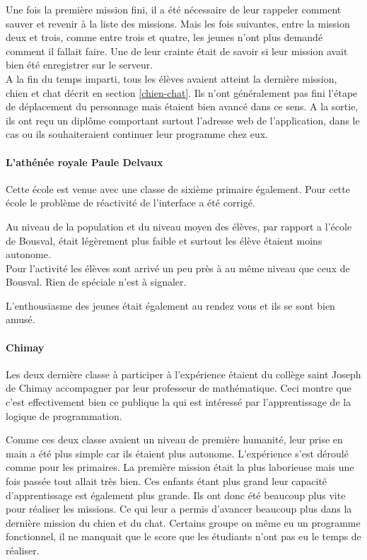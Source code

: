 Une fois la première mission fini, il a été nécessaire de leur rappeler comment sauver et revenir à la liste des missions. Mais les fois suivantes, entre la mission deux et trois, comme entre trois et quatre, les jeunes n'ont plus demandé comment il fallait faire. Une de leur crainte était de savoir si leur mission avait bien été enregistrer sur le serveur.\\ %

A la fin du temps imparti, tous les élèves avaient atteint la dernière mission, chien et chat décrit en section \ref{chien-chat}. Ils n'ont généralement pas fini l'étape de déplacement du personnage mais étaient bien avancé dans ce sens. A la sortie, ils ont reçu un diplôme comportant surtout l'adresse web de l'application, dans le cas ou ils souhaiteraient continuer leur programme chez eux.

\paragraph{L'athénée royale Paule Delvaux}
Cette école est venue avec une classe de sixième primaire également. Pour cette école le problème de réactivité de l'interface a été corrigé.

Au niveau de la population et du niveau moyen des élèves, par rapport a l'école de Bousval, était légèrement plus faible et surtout les élève étaient moins autonome.\\

Pour l'activité les élèves sont arrivé un peu près à au même niveau que ceux de Bousval. Rien de spéciale n'est à signaler.

L'enthousiasme des jeunes était également au rendez vous et ils se sont bien amusé.

\paragraph{Chimay}
Les deux dernière classe à participer à l'expérience étaient du collège saint Joseph de Chimay accompagner par leur professeur de mathématique. Ceci montre que c'est effectivement bien ce publique la qui est intéressé par l'apprentissage de la logique de programmation.

Comme ces deux classe avaient un niveau de première humanité, leur prise en main a été plus simple car ils étaient plus autonome. L'expérience s'est déroulé comme pour les primaires. La première mission était la plus laborieuse mais une fois passée tout allait très bien. Ces enfants étant plus grand leur capacité d'apprentissage est également plus grande. Ils ont donc été beaucoup plus vite pour réaliser les missions. Ce qui leur a permis d'avancer beaucoup plus dans la dernière mission du chien et du chat. Certains groupe on même eu un programme fonctionnel, il ne manquait que le score que les étudiants n'ont pas eu le temps de réaliser.\\

